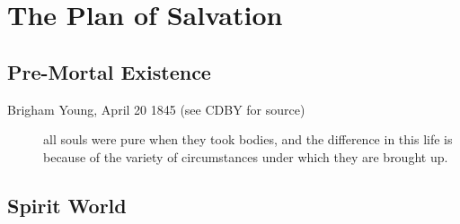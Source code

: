 \section{The Plan of Salvation}

	\subsection{Pre-Mortal Existence}
	
		\begin{description}
		
			\item[Brigham Young, April 20 1845 (see CDBY for source)] all souls were pure when they took bodies, and the difference in this life is because of the variety of circumstances under which they are brought up.
		
		\end{description}

	\subsection{Spirit World}
	
